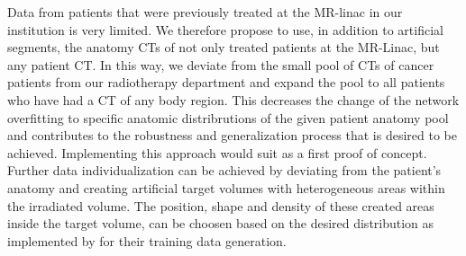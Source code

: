 Data from patients that were previously treated at the MR-linac in our institution is very limited.
We therefore propose to use, in addition to artificial segments, the anatomy CTs of not only treated patients at the MR-Linac, but any patient CT\@.
In this way, we deviate from the small pool of CTs of cancer patients from our radiotherapy department and expand the pool to all patients who have had a CT of any body region.
This decreases the change of the network overfitting to specific anatomic distribrutions of the given patient anatomy pool and contributes to the robustness and generalization process that is desired to be achieved.
Implementing this approach would suit as a first proof of concept. 
Further data individualization can be achieved by deviating from the patient's anatomy and creating artificial target volumes with heterogeneous areas within the irradiated volume.
The position, shape and density of these created areas inside the target volume, can be choosen based on the desired distribution as implemented by \citeauthor{neishabouri_long_2021} for their training data generation.\\

